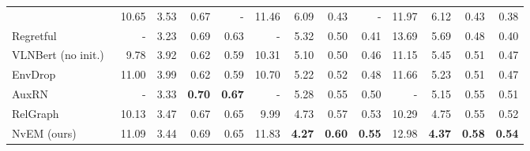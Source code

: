 \documentclass[sigconf]{acmart}
\begin{document}
\begin{table*}[htbp]
{\begin{tabular}{lrrrrrrrrrrrr}
			& 10.65 & 3.53 & 0.67 & -    & 11.46 & 6.09 & 0.43 & -    & 11.97 & 6.12 & 0.43 & 0.38 \\
			Regretful~\cite{ma2019regretful}
			& -     & 3.23 & 0.69 & 0.63 & -     & 5.32 & 0.50 & 0.41 & 13.69 & 5.69 & 0.48 & 0.40 \\
			VLNBert (no init.)~\cite{hong2020vln-bert} & 9.78 & 3.92 & 0.62 & 0.59 & 10.31 & 5.10 & 0.50 & 0.46 & 11.15 & 5.45 & 0.51 & 0.47 \\
			EnvDrop~\cite{tan2019envdrop}
			& 11.00 & 3.99 & 0.62 & 0.59 & 10.70 & 5.22 & 0.52 & 0.48 & 11.66 & 5.23 & 0.51 & 0.47 \\
			AuxRN~\cite{zhu2020self-supervised}
			& -     & 3.33 & \textbf{0.70} & \textbf{0.67} & -     & 5.28 & 0.55 & 0.50 & -     & 5.15 & 0.55 & 0.51 \\
			RelGraph~\cite{hong2020relgraph}                  & 10.13 & 3.47 & 0.67 & 0.65 & 9.99  & 4.73 & 0.57 & 0.53 & 10.29 & 4.75 & 0.55 & 0.52 \\
			NvEM (ours) & 11.09 & 3.44 & 0.69 & 0.65 & 11.83 & \textbf{4.27} & \textbf{0.60} & \textbf{0.55} & 12.98 & \textbf{4.37} & \textbf{0.58} & \textbf{0.54} \\
			\bottomrule
	\end{tabular}}
\end{table*}
\end{document}
